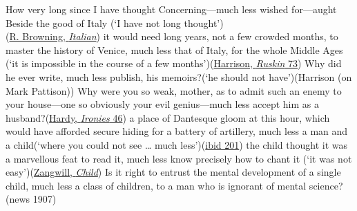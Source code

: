 \ea \label{ex:04-246}
\ea
How very long since I have thought Concerning---much less wished for---aught Beside the good of Italy \phantom{x} (`I have not long thought')\\\hfill(\href{https://archive.org/details/dli.ernet.212792/page/19/mode/2up?q=\%22aught+Beside+the+good+of+Italy\%22&view=theater}{R. Browning, \textit{Italian}})
\ex
it would need long years, not a few crowded months, to master the history of Venice, much less that of Italy, for the whole Middle Ages \phantom{x} (`it is impossible in the course of a few months')\hfill(\href{https://archive.org/details/in.ernet.dli.2015.179024/page/n85/mode/2up?q=\%22would+need+long+years\%22&view=theater}{Harrison, \textit{Ruskin} 73})
\ex
Why did he ever write, much less publish, his memoirs?\newline (`he should not have')\hfill(Harrison (on Mark Pattison))
\ex
Why were you so weak, mother, as to admit such an enemy to your house---one so obviously your evil genius---much less accept him as a husband?\hfill(\href{https://archive.org/details/lifeslittleironi00hard_0/page/38/mode/2up?q=\%22much+less+accept+him+as+a+husband%3F\%22&view=theater}{Hardy, \textit{Ironies} 46}) %
\ex
a place of Dantesque gloom at this hour, which would have afforded secure hiding for a battery of artillery, much less a man and a child\newline (`where you could not see {\dots} much less')\hfill(\href{https://archive.org/details/lifeslittleironi00hard_0/page/172/mode/2up?q=\%22much+less+a+man+and+a+child\%22&view=theater}{ibid 201})
\ex
the child thought it was a marvellous feat to read it, much less know precisely how to chant it \phantom{x} (`it was not easy')\hfill(\href{https://archive.org/details/dreamersofghetto00zangiala/page/8/mode/2up?q=\%22the+child+thought+it+was+a+marvellous+feat+to+read+it%2C+much+less+know+precisely+how+to+chant+it\%22&view=theater}{Zangwill, \textit{Child}}) %
\ex
Is it right to entrust the mental development of a single child, much less a class of children, to a man who is ignorant of mental science?\\\hfill(news 1907)
\z
\z

